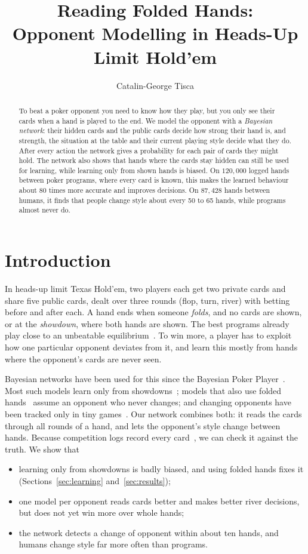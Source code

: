 \documentclass[11pt,a4paper]{article}
\title{Reading Folded Hands:\\Opponent Modelling in Heads-Up Limit Hold'em}
\author{Catalin-George Tisca}
\date{}
\begin{document}
\maketitle

\begin{abstract}
To beat a poker opponent you need to know how they play, but you only see
their cards when a hand is played to the end. We model the opponent with a
\emph{Bayesian network}: their hidden cards and the public cards decide how
strong their hand is, and strength, the situation at the table and their
current playing style decide what they do. After every action the network
gives a probability for each pair of cards they might hold. The network also
shows that hands where the cards stay hidden can still be used for learning,
while learning only from shown hands is biased. On $120{,}000$ logged hands
between poker programs, where every card is known, this makes the learned
behaviour about 80 times more accurate and improves decisions. On $87{,}428$
hands between humans, it finds that people change style about every 50 to 65
hands, while programs almost never do.
\end{abstract}

\section{Introduction}

In heads-up limit Texas Hold'em, two players each get two private cards and
share five public cards, dealt over three rounds (flop, turn, river) with
betting before and after each. A hand ends when someone \emph{folds}, and no
cards are shown, or at the \emph{showdown}, where both hands are shown. The best
programs already play close to an unbeatable equilibrium~\cite{bowling2015}. To
win more, a player has to exploit how one particular opponent deviates from it,
and learn this mostly from hands where the opponent's cards are never seen.

Bayesian networks have been used for this since the Bayesian Poker
Player~\cite{korb1999,nicholson2006}. Most such models learn only from
showdowns~\cite{korb1999,nicholson2006,terry2005}; models that also use folded
hands~\cite{southey2005,ponsen2008} assume an opponent who never changes; and
changing opponents have been tracked only in tiny games~\cite{bard2007}. Our
network combines both: it reads the cards through all rounds of a hand, and lets
the opponent's style change between hands. Because competition logs record
every card~\cite{phhdata}, we can check it against the truth. We show that
\begin{itemize}
  \item learning only from showdowns is badly biased, and using folded hands
        fixes it (Sections~\ref{sec:learning} and~\ref{sec:results});
  \item one model per opponent reads cards better and makes better river
        decisions, but does not yet win more over whole hands;
  \item the network detects a change of opponent within about ten hands, and
        humans change style far more often than programs.
\end{itemize}
\end{document}
